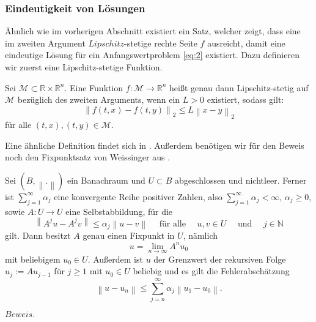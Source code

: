 \subsubsection{Eindeutigkeit von Lösungen}
Ähnlich wie im vorherigen Abschnitt existiert ein Satz, welcher zeigt, dass eine im zweiten Argument $Lipschitz$-stetige
rechte Seite $f$ ausreicht, damit eine eindeutige Lösung für ein Anfangswertproblem \eqref{eq:2} existiert. Dazu
definieren wir zuerst eine Lipschitz-stetige Funktion.
\begin{definition}
    Sei $\mathcal{M} \subset \mathbb{R} \times \mathbb{R}^{n}$. Eine Funktion $f: \mathcal{M} \rightarrow \mathbb{R}^n$
    heißt genau dann Lipschitz-stetig auf $\mathcal{M}$ bezüglich des zweiten Arguments, wenn ein $L>0$ existiert,
    sodass gilt:
    \[
        \left\lVert f(t,x) - f(t,y) \right\rVert_2 \leq L \left\lVert x - y  \right\rVert_2
    \]
    für alle $(t,x), (t,y) \in \mathcal{M}$.
\end{definition}
Eine ähnliche Definition findet sich in \cite[36-37]{ernsthairergerhardwannerSolvingOrdinaryDifferential}. Außerdem
benötigen wir für den Beweis noch den Fixpunktsatz von Weissinger aus
\cite{harroheuserGewohnlicheDifferentialgleichungen}.
\begin{satz}
    \label{Fixpunktsatzvonweissinger}
    Sei $\left( B, \left\lVert . \right\rVert \right) $ ein Banachraum und $U \subset B$ abgeschlossen und nichtleer.
    Ferner ist $\sum_{j=1}^{\infty} \alpha_j$ eine konvergente Reihe positiver Zahlen, also \linebreak
    $\sum_{j=1}^{\infty} \alpha_j < \infty $, $\alpha_j \geq 0$, sowie $A:U \rightarrow U$ eine Selbstabbildung, für die
    \[
        \left\lVert A^{j}u - A^{j}v \right\rVert \leq \alpha_j \left\lVert u - v \right\rVert \quad \text{ für alle }
        \quad u,v \in U \quad \text{ und } \quad j \in \mathbb{N}
    \]
    gilt. Dann besitzt $A$ genau einen Fixpunkt in $U$, nämlich
    \[
        u = \lim_{n\rightarrow \infty} A^{n}u_0
    \]
    mit beliebigem $u_0 \in U$. Außerdem ist $u$ der Grenzwert der rekursiven Folge $u_j:=Au_{j-1}$ für $j \geq 1$
    mit $u_0 \in U$ beliebig und es gilt die Fehlerabschätzung
    \[
        \left\lVert u - u_n \right\rVert \leq \sum_{j=n}^{\infty} \alpha_j \left\lVert u_1 - u_0 \right\rVert.
    \]
\end{satz}
$Beweis.$ \cite[139]{harroheuserGewohnlicheDifferentialgleichungen}\\
